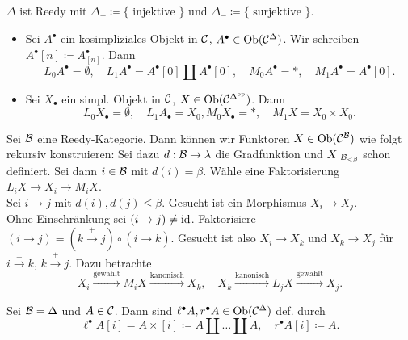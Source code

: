 \documentclass{cheat-sheet}
\begin{document}
\begin{bsp}
  $\Delta$ ist Reedy mit $\Delta_{+} \coloneqq \{\text{ injektive }\}$ und $\Delta_{-} \coloneqq \{\text{ surjektive }\}$.
\end{bsp}

\begin{bspe}
  \begin{itemize}
    \item Sei $A^\bullet$ ein kosimpliziales Objekt in $\mathcal{C}$, \dh{} $A^\bullet \in \operatorname{Ob}(\mathcal{C}^\Delta)$.
    Wir schreiben $A^\bullet [n] \coloneqq A^\bullet_{[n]}$. Dann
    \[
      L_0 A^\bullet \!=\! \emptyset, \quad
      L_1 A^\bullet \!=\! A^\bullet[0] \amalg A^\bullet [0], \quad
      M_0 A^\bullet \!=\! *, \quad
      M_1 A^\bullet \!=\! A^\bullet [0].
    \]
    \item Sei $X_\bullet$ ein simpl. Objekt in $\mathcal{C}$, \dh{} $X \in \operatorname{Ob}(\mathcal{C}^{\Delta^{\mathrm{op}}})$. Dann
    \[
      L_0 X_\bullet = \emptyset, \quad
      L_1 A_\bullet = X_0, M_0 X_\bullet = *, \quad
      M_1 X = X_0 \times X_0.
    \]
  \end{itemize}
\end{bspe}

\begin{bem}
  Sei $\mathcal{B}$ eine Reedy-Kategorie.
  Dann können wir Funktoren $X \in \operatorname{Ob}(\mathcal{C}^{\mathcal{B}})$ wie folgt rekursiv konstruieren:
  Sei dazu $d : \mathcal{B} \to \lambda$ die Gradfunktion und $X|_{\mathcal{B}_{< \beta}}$ schon definiert.
  Sei dann $i \in \mathcal{B}$ mit $d(i) = \beta$.
  Wähle eine Faktorisierung $L_i X \to X_i \to M_i X$. \\
  Sei $i \to j$ mit $d(i), d(j) \leq \beta$.
  Gesucht ist ein Morphismus $X_i \to X_j$. \\
  Ohne Einschränkung sei $(i \to j) \neq \operatorname{id}$.
  Faktorisiere $(i \to j) = (k \xrightarrow{{+}} j) \circ (i \xrightarrow{{-}} k)$.
  Gesucht ist also $X_i \to X_k$ und $X_k \to X_j$ für $i \xrightarrow{{-}} k$, $k \xrightarrow{{+}} j$.
  Dazu betrachte
  \[
    X_i \xrightarrow{\text{gewählt}} M_i X \xrightarrow{\text{kanonisch}} X_k, \quad
    X_k \xrightarrow{\text{kanonisch}} L_j X \xrightarrow{\text{gewählt}} X_j.
  \]
\end{bem}

\iffalse
\begin{bsp}
  Sei $\Bat = \Delta$ und $A \in \Cat$. Ziel: Konstruktion $X^\bullet \in \Cat^{\Delta}$.
\end{bsp}
\fi

\begin{defn}
  Sei $\Bat = \Delta$ und $A \in \Cat$.
  Dann sind $\ell^\bullet A, r^\bullet A \in \operatorname{Ob}(\mathcal{C}^\Delta)$ def. durch
  \[
    \ell^\bullet A [i] = A \times [i] \coloneqq A \amalg \ldots \amalg A, \quad
    r^\bullet A [i] \coloneqq A.
  \]
\end{defn}
\end{document}
